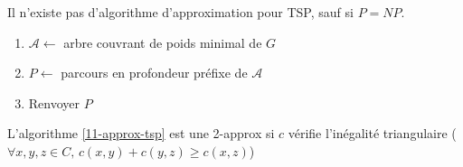 \begin{theorem}
	Il n'existe pas d'algorithme d'approximation pour TSP, sauf si $P = NP$.
\end{theorem}

\begin{algo}
	\label{11-approx-tsp}
	\enspace \begin{enumerate}
		\item $\mathcal A \gets$ arbre couvrant de poids minimal de $G$
		\item $P \gets$ parcours en profondeur préfixe de $\mathcal A$
		\item Renvoyer $P$
	\end{enumerate}
\end{algo}

\begin{proposition}
	L'algorithme \ref{11-approx-tsp} est une 2-approx si $c$ vérifie l'inégalité triangulaire ($\forall x, y, z\in C, \, c(x, y) + c(y, z) \geq c(x, z)$)
\end{proposition}

